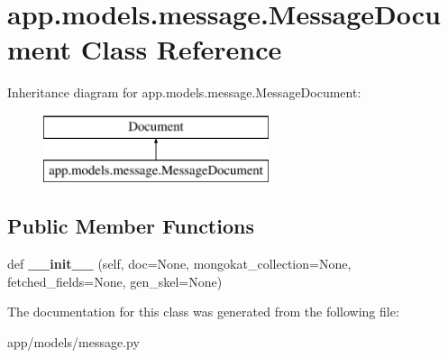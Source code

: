 \hypertarget{classapp_1_1models_1_1message_1_1_message_document}{}\section{app.\+models.\+message.\+Message\+Document Class Reference}
\label{classapp_1_1models_1_1message_1_1_message_document}
Inheritance diagram for app.\+models.\+message.\+Message\+Document\+:\begin{figure}[H]
\begin{center}
\leavevmode
\includegraphics[height=2.000000cm]{classapp_1_1models_1_1message_1_1_message_document}
\end{center}
\end{figure}
\subsection*{Public Member Functions}
\begin{DoxyCompactItemize}
\item 
\mbox{\label{classapp_1_1models_1_1message_1_1_message_document_ae323a3581023f0823d6ef29b117e5dfd}} 
def {\bfseries \+\_\+\+\_\+init\+\_\+\+\_\+} (self, doc=None, mongokat\+\_\+collection=None, fetched\+\_\+fields=None, gen\+\_\+skel=None)
\end{DoxyCompactItemize}


The documentation for this class was generated from the following file\+:\begin{DoxyCompactItemize}
\item 
app/models/message.\+py\end{DoxyCompactItemize}
